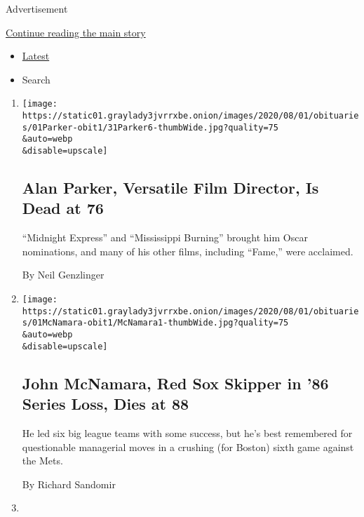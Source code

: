 Advertisement

\protect\hyperlink{after-mid2}{Continue reading the main story}

\begin{itemize}
\tightlist
\item
  \protect\hyperlink{stream-panel}{Latest}
\item
  Search
\end{itemize}

\begin{enumerate}
\def\labelenumi{\arabic{enumi}.}
\item
  \href{/2020/07/31/movies/alan-parker-versatile-film-director-is-dead-at-76.html}{}

  \texttt{[image: https://static01.graylady3jvrrxbe.onion/images/2020/08/01/obituaries/01Parker-obit1/31Parker6-thumbWide.jpg?quality=75\\\&auto=webp\\\&disable=upscale]}

  \hypertarget{alan-parker-versatile-film-director-is-dead-at-76}{%
  \subsection{Alan Parker, Versatile Film Director, Is Dead at
  76}\label{alan-parker-versatile-film-director-is-dead-at-76}}

  ``Midnight Express'' and ``Mississippi Burning'' brought him Oscar
  nominations, and many of his other films, including ``Fame,'' were
  acclaimed.

  By Neil Genzlinger
\item
  \href{/2020/07/31/sports/baseball/john-mcnamara-dead.html}{}

  \texttt{[image: https://static01.graylady3jvrrxbe.onion/images/2020/08/01/obituaries/01McNamara-obit1/McNamara1-thumbWide.jpg?quality=75\\\&auto=webp\\\&disable=upscale]}

  \hypertarget{john-mcnamara-red-sox-skipper-in-86-series-loss-dies-at-88}{%
  \subsection{John McNamara, Red Sox Skipper in '86 Series Loss, Dies at
  88}\label{john-mcnamara-red-sox-skipper-in-86-series-loss-dies-at-88}}

  He led six big league teams with some success, but he's best
  remembered for questionable managerial moves in a crushing (for
  Boston) sixth game against the Mets.

  By Richard Sandomir
\item
  \href{/interactive/2020/07/31/briefing/troops-baseball-louie-gohmert-news-quiz.html}{}


\end{enumerate}

